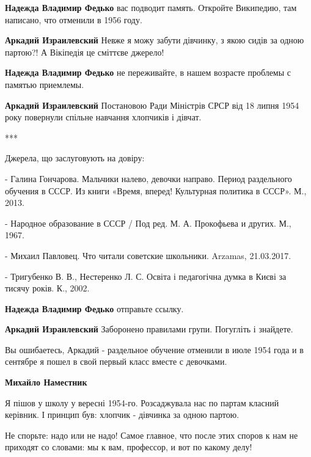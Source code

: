 \begin{itemize}
\begin{itemize}
\begin{itemize}
\textbf{Надежда Владимир Федько} вас подводит память. Откройте Википедию, там написано, что отменили в 1956 году.

\textbf{Аркадий Израилевский} Невже я можу забути дівчинку, з якою сидів за одною партою?!
А Вікіпедія це сміттєве джерело!

\textbf{Надежда Владимир Федько} не переживайте, в нашем возрасте проблемы с памятью приемлемы.

\textbf{Аркадий Израилевский} Постановою Ради Міністрів СРСР від 18 липня 1954 року повернули спільне навчання хлопчиків і дівчат.

***

Джерела, що заслуговують на довіру:

- Галина Гончарова. Мальчики налево, девочки направо. Период раздельного
обучения в СССР. Из книги «Время, вперед! Культурная политика в СССР». М.,
2013.

- Народное образование в СССР / Под ред. М. А. Прокофьева и других. М., 1967.

- Михаил Павловец. Что читали советские школьники. Arzamas, 21.03.2017.

- Тригубенко В. В., Нестеренко Л. С. Освіта і педагогічна думка в Києві за
тисячу років. К., 2002.

\textbf{Надежда Владимир Федько} отправьте ссылку.

\textbf{Аркадий Израилевский} Заборонено правилами групи.
Погугліть і знайдете.
\end{itemize} %

\end{itemize} %


Вы ошибаетесь, Аркадий - раздельное обучение отменили в июле 1954 года и в
сентябре я пошел в свой первый класс вместе с девочками.

\textbf{Михайло Наместник} 

Я пішов у школу у вересні 1954-го. Розсаджувала нас по партам класний керівник.
І принцип був: хлопчик - дівчинка за одною партою.


Не спорьте: надо или не надо! Самое главное, что после этих споров к нам не
приходят со словами: мы к вам, профессор, и вот по какому делу!


\end{itemize}
